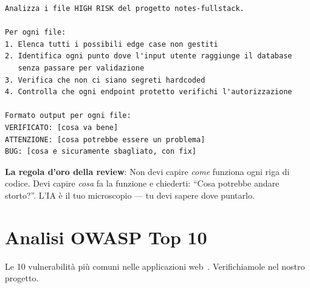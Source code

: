 \begin{praticabox}[title={Pratica --- Review assistita dall'IA}]
\begin{lstlisting}[language={}]
Analizza i file HIGH RISK del progetto notes-fullstack.

Per ogni file:
1. Elenca tutti i possibili edge case non gestiti
2. Identifica ogni punto dove l'input utente raggiunge il database
   senza passare per validazione
3. Verifica che non ci siano segreti hardcoded
4. Controlla che ogni endpoint protetto verifichi l'autorizzazione

Formato output per ogni file:
VERIFICATO: [cosa va bene]
ATTENZIONE: [cosa potrebbe essere un problema]
BUG: [cosa e sicuramente sbagliato, con fix]
\end{lstlisting}
\end{praticabox}

\begin{tipbox}
\textbf{La regola d'oro della review}: Non devi capire \textit{come} funziona ogni riga di codice. Devi capire \textit{cosa} fa la funzione e chiederti: ``Cosa potrebbe andare storto?''. L'IA è il tuo microscopio --- tu devi sapere dove puntarlo.
\end{tipbox}

\section{Analisi OWASP Top 10}

Le 10 vulnerabilità più comuni nelle applicazioni web~\cite{owasp:top10}. Verifichiamole nel nostro progetto.


